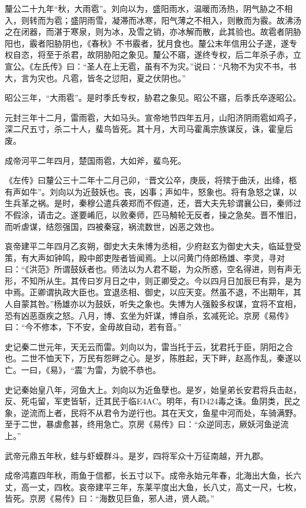 \documentclass[]{article}
\begin{document}
釐公二十九年``秋，大雨雹''。刘向以为，盛阳雨水，温暖而汤热，阴气胁之不相入，则转而为雹；盛阴雨雪，凝滞而冰寒，阳气薄之不相入，则散而为霰。故沸汤之在闭器，而湛于寒泉，则为冰，及雪之销，亦冰解而散，此其验也。故雹者阴胁阳也，霰者阳胁阴也，《春秋》不书霰者，犹月食也。釐公末年信用公子遂，遂专权自恣，将至于杀君，故阴胁阳之象见。釐公不寤，遂终专权，后二年杀子赤，立宣公。《左氏传》曰：``圣人在上无雹，虽有不为灾。''说曰：``凡物不为灾不书，书大，言为灾也。凡雹，皆冬之愆阳，夏之伏阴也。''

昭公三年，``大雨雹''。是时季氏专权，胁君之象见。昭公不寤，后季氏卒逐昭公。

元封三年十二月，雷雨雹，大如马头。宣帝地节四年五月，山阳济阴雨雹如鸡子，深二尺五寸，杀二十人，蜚鸟皆死。其十月，大司马霍禹宗族谋反，诛，霍皇后废。

成帝河平二年四月，楚国雨雹，大如斧，蜚鸟死。

《左传》曰釐公三十二年十二月己卯，``晋文公卒，庚辰，将殡于曲沃，出绛，柩有声如牛''。刘向以为近鼓妖也。丧，凶事；声如牛，怒象也。将有急怒之谋，以生兵革之祸。是时，秦穆公遣兵袭郑而不假道，还，晋大夫先轸谓襄公曰，秦师过不假涂，请击之。遂要崤厄，以败秦师，匹马觭轮无反者，操之急矣。晋不惟旧，而听虐谋，结怨强国，四被秦寇，祸流数世，凶恶之效也。

哀帝建平二年四月乙亥朔，御史大夫朱博为丞相，少府赵玄为御史大夫，临延登受策，有大声如钟鸣，殿中郎吏陛者皆闻焉。上以问黄门侍郎杨雄、李灵，寻对曰：``《洪范》所谓鼓妖者也。师法以为人君不聪，为众所惑，空名得进，则有声无形，不知所从生。其传曰岁月日之中，则正卿受之。今以四月日加辰巳有异，是为中焉。正卿谓执政大臣也。宜退丞相、御史，以应天变。然虽不退，不出期年，其人自蒙其咎。''杨雄亦以为鼓妖，听失之象也。失博为人强毅多权谋，宜将不宜相，恐有凶恶亟疾之怒。八月，博、玄坐为奸谋，博自杀，玄减死论。京房《易传》曰：``今不修本，下不安，金毋故自动，若有音。''

史记秦二世元年，天无云而雷。刘向以为，雷当托于云，犹君托于臣，阴阳之合也。二世不恤天下，万民有怨畔之心。是岁，陈胜起，天下畔，赵高作乱，秦遂以亡。一曰，《易》，``震''为雷，为貌不恭也。

史记秦始皇八年，河鱼大上。刘向以为近鱼孽也。是岁，始皇弟长安君将兵击赵，反、死屯留，军吏皆斩，迁其民于临E4AC。明年，有D424毒之诛。鱼阴类，民之象，逆流而上者，民将不从君令为逆行也。其在天文，鱼星中河而处，车骑满野。至于二世，暴虐愈甚，终用急亡。京房《易传》曰：``众逆同志，厥妖河鱼逆流上。''

武帝元鼎五年秋，蛙与虾蟆群斗。是岁，四将军众十万征南越，开九郡。

成帝鸿嘉四年秋，雨鱼于信都，长五寸以下。成帝永始元年春，北海出大鱼，长六丈，高一丈，四枚。哀帝建平三年，东莱平度出大鱼，长八丈，高丈一尺，七枚，皆死。京房《易传》曰：``海数见巨鱼，邪人进，贤人疏。''
\end{document}
